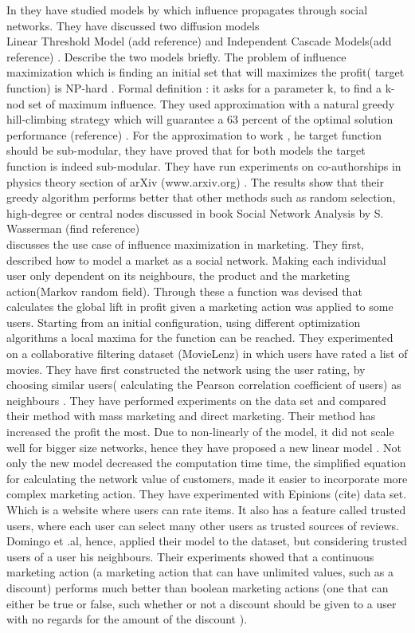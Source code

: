 \documentclass[english]{tktltiki}
\begin{document}
In \cite{kempe03} they have studied models by which influence propagates through social networks. They have discussed two diffusion models \\
Linear Threshold Model (add reference) and Independent Cascade Models(add reference) . Describe the two models briefly. 
The problem of influence maximization which is finding an initial set that will maximizes the profit( target function) is NP-hard . 
Formal definition : it asks for a parameter k, to find a k-nod set of maximum influence. They used approximation with a natural greedy hill-climbing strategy which will guarantee a 63 percent of the optimal solution performance (reference) . For the approximation to work , he target function should be sub-modular, they have proved that for both models the target function is indeed sub-modular.  They have run experiments on co-authorships in physics theory section of arXiv (www.arxiv.org) . The results show that their greedy algorithm performs better that other methods such as random selection, high-degree or central nodes discussed in book Social Network Analysis by S. Wasserman (find reference) \\
\cite{domingo01} discusses the use case of influence maximization in marketing. They first, described how to model a market as a social network. Making each individual user only dependent on its neighbours, the product and the marketing action(Markov random field). Through these a function was devised that calculates the global lift in profit given a marketing action was applied to some users. Starting from an initial configuration, using different optimization algorithms a local maxima for the function can be reached. 
They experimented on a collaborative filtering dataset (MovieLenz) in which users have rated a list of movies. They have first constructed the network using the user rating, by choosing similar users( calculating the Pearson correlation coefficient of users) as neighbours . They have performed experiments on the data set and compared their method with mass marketing and direct marketing. Their method has increased the profit the most. Due to non-linearly of the model, it did not scale well for bigger size networks, hence they have proposed a new linear model \cite{domingo02}. Not only the new model decreased the computation time time, the simplified equation for calculating the network value of customers, made it easier to incorporate more complex marketing action. They have experimented with Epinions (cite) data set. Which is a website where users can rate items. It also has a feature called trusted users, where each user can select many other users as trusted sources of reviews. Domingo et .al, hence, applied their model to the dataset, but considering trusted users of a user his neighbours. Their experiments showed that a continuous marketing action (a marketing action that can have unlimited values, such as a discount) performs much better than boolean marketing actions (one that can either be true or false, such whether or not a discount should be given to a user with no regards for the amount of the discount ). 
\end{document}
